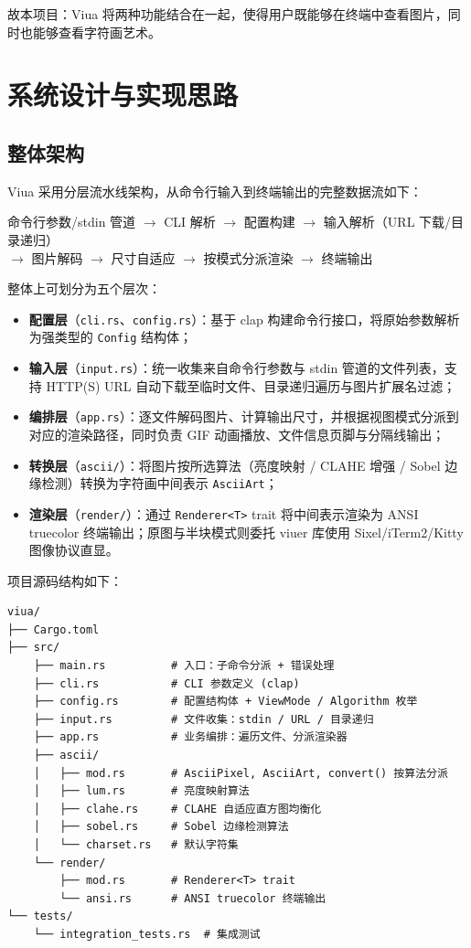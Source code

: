 \documentclass{SYSUReport}
\begin{document}
故本项目：Viua 将两种功能结合在一起，使得用户既能够在终端中查看图片，同时也能够查看字符画艺术。


\section{系统设计与实现思路}
\subsection{整体架构}

Viua 采用分层流水线架构，从命令行输入到终端输出的完整数据流如下：

\begin{center}
命令行参数/stdin 管道 $\rightarrow$ CLI 解析 $\rightarrow$ 配置构建 $\rightarrow$ 输入解析（URL 下载/目录递归）\\
$\rightarrow$ 图片解码 $\rightarrow$ 尺寸自适应 $\rightarrow$ 按模式分派渲染 $\rightarrow$ 终端输出
\end{center}

整体上可划分为五个层次：

\begin{itemize}
    \item \textbf{配置层}（\texttt{cli.rs}、\texttt{config.rs}）：基于 clap 构建命令行接口，将原始参数解析为强类型的 \texttt{Config} 结构体；
    \item \textbf{输入层}（\texttt{input.rs}）：统一收集来自命令行参数与 stdin 管道的文件列表，支持 HTTP(S) URL 自动下载至临时文件、目录递归遍历与图片扩展名过滤；
    \item \textbf{编排层}（\texttt{app.rs}）：逐文件解码图片、计算输出尺寸，并根据视图模式分派到对应的渲染路径，同时负责 GIF 动画播放、文件信息页脚与分隔线输出；
    \item \textbf{转换层}（\texttt{ascii/}）：将图片按所选算法（亮度映射 / CLAHE 增强 / Sobel 边缘检测）转换为字符画中间表示 \texttt{AsciiArt}；
    \item \textbf{渲染层}（\texttt{render/}）：通过 \texttt{Renderer<T>} trait 将中间表示渲染为 ANSI truecolor 终端输出；原图与半块模式则委托 viuer 库使用 Sixel/iTerm2/Kitty 图像协议直显。
\end{itemize}

项目源码结构如下：

\begin{verbatim}
viua/
├── Cargo.toml
├── src/
    ├── main.rs          # 入口：子命令分派 + 错误处理
    ├── cli.rs           # CLI 参数定义 (clap)
    ├── config.rs        # 配置结构体 + ViewMode / Algorithm 枚举
    ├── input.rs         # 文件收集：stdin / URL / 目录递归
    ├── app.rs           # 业务编排：遍历文件、分派渲染器
    ├── ascii/
    │   ├── mod.rs       # AsciiPixel, AsciiArt, convert() 按算法分派
    │   ├── lum.rs       # 亮度映射算法
    │   ├── clahe.rs     # CLAHE 自适应直方图均衡化
    │   ├── sobel.rs     # Sobel 边缘检测算法
    │   └── charset.rs   # 默认字符集
    └── render/
        ├── mod.rs       # Renderer<T> trait
        └── ansi.rs      # ANSI truecolor 终端输出
└── tests/
    └── integration_tests.rs  # 集成测试
\end{verbatim}
\end{document}
